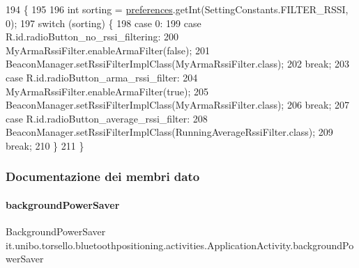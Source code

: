 \begin{DoxyCode}
194                                  \{
195 
196         \textcolor{keywordtype}{int} sorting = \hyperlink{classit_1_1unibo_1_1torsello_1_1bluetoothpositioning_1_1activities_1_1ApplicationActivity_a3ee672ef79c268d0618ff3276c2e85f0_a3ee672ef79c268d0618ff3276c2e85f0}{preferences}.getInt(SettingConstants.FILTER\_RSSI, 0);
197         \textcolor{keywordflow}{switch} (sorting) \{
198             \textcolor{keywordflow}{case} 0:
199             \textcolor{keywordflow}{case} R.id.radioButton\_no\_rssi\_filtering:
200                 MyArmaRssiFilter.enableArmaFilter(\textcolor{keyword}{false});
201                 BeaconManager.setRssiFilterImplClass(MyArmaRssiFilter.class);
202                 \textcolor{keywordflow}{break};
203             \textcolor{keywordflow}{case} R.id.radioButton\_arma\_rssi\_filter:
204                 MyArmaRssiFilter.enableArmaFilter(\textcolor{keyword}{true});
205                 BeaconManager.setRssiFilterImplClass(MyArmaRssiFilter.class);
206                 \textcolor{keywordflow}{break};
207             \textcolor{keywordflow}{case} R.id.radioButton\_average\_rssi\_filter:
208                 BeaconManager.setRssiFilterImplClass(RunningAverageRssiFilter.class);
209                 \textcolor{keywordflow}{break};
210         \}
211     \}
\end{DoxyCode}


\subsubsection{Documentazione dei membri dato}
\hypertarget{classit_1_1unibo_1_1torsello_1_1bluetoothpositioning_1_1activities_1_1ApplicationActivity_a85885639575161f4d73d4fc788f44ace_a85885639575161f4d73d4fc788f44ace}{}\label{classit_1_1unibo_1_1torsello_1_1bluetoothpositioning_1_1activities_1_1ApplicationActivity_a85885639575161f4d73d4fc788f44ace_a85885639575161f4d73d4fc788f44ace} 
\paragraph{\texorpdfstring{background\+Power\+Saver}{backgroundPowerSaver}}
{\footnotesize\ttfamily Background\+Power\+Saver it.\+unibo.\+torsello.\+bluetoothpositioning.\+activities.\+Application\+Activity.\+background\+Power\+Saver\hspace{0.3cm}{\ttfamily [private]}}

